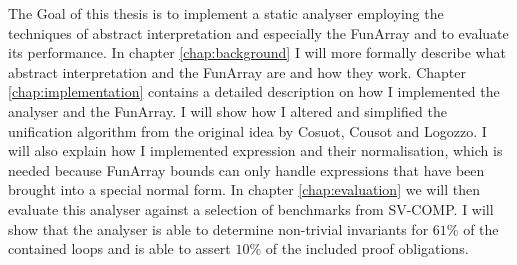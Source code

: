 The Goal of this thesis is to implement a static analyser employing the techniques of abstract interpretation and especially the FunArray and to evaluate its performance. In chapter \ref{chap:background} I will more formally describe what abstract interpretation and the FunArray are and how they work. Chapter \ref{chap:implementation} contains a detailed description on how I implemented the analyser and the FunArray. I will show how I altered and simplified the unification algorithm from the original idea by Cosuot, Cousot and Logozzo. I will also explain how I implemented expression and their normalisation, which is needed because FunArray bounds can only handle expressions that have been brought into a special normal form. In chapter \ref{chap:evaluation} we will then evaluate this analyser against a selection of benchmarks from SV-COMP. I will show that the analyser is able to determine non-trivial invariants for $61\%$ of the contained loops and is able to assert $10\%$ of the included proof obligations.



















 